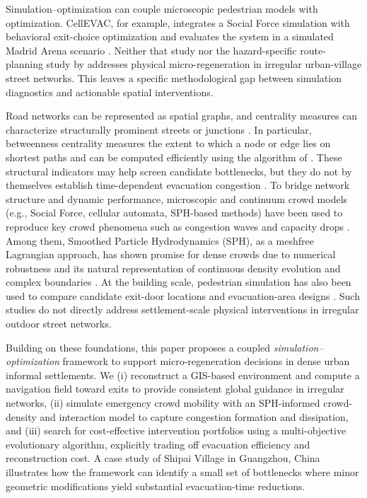 \documentclass[preprint,12pt]{elsarticle}
\begin{document}
Simulation--optimization can couple microscopic pedestrian models with optimization. CellEVAC, for example, integrates a Social Force simulation with behavioral exit-choice optimization and evaluates the system in a simulated Madrid Arena scenario \citep{LopezCarmonaGarcia2021CellEVAC}. Neither that study nor the hazard-specific route-planning study by \cite{yang2025} addresses physical micro-regeneration in irregular urban-village street networks. This leaves a specific methodological gap between simulation diagnostics and actionable spatial interventions.

Road networks can be represented as spatial graphs, and centrality measures can characterize structurally prominent streets or junctions \citep{Crucitti2006CentralityStreets}. In particular, betweenness centrality measures the extent to which a node or edge lies on shortest paths and can be computed efficiently using the algorithm of \cite{Brandes2001Betweenness}. These structural indicators may help screen candidate bottlenecks, but they do not by themselves establish time-dependent evacuation congestion \citep{Helbing2000Panic,Hughes2002ContinuumPedestrians}.
To bridge network structure and dynamic performance, microscopic and continuum crowd models (e.g., Social Force, cellular automata, SPH-based methods) have been used to reproduce key crowd phenomena such as congestion waves and capacity drops \citep{DANG2024102955}.
Among them, Smoothed Particle Hydrodynamics (SPH), as a meshfree Lagrangian approach, has shown promise for dense crowds due to numerical robustness and its natural representation of continuous density evolution and complex boundaries \citep{Yuan2020SPHPedestrianFlow,DANG2024102955}.
At the building scale, pedestrian simulation has also been used to compare candidate exit-door locations and evacuation-area designs \citep{muhammed2020simulation}. Such studies do not directly address settlement-scale physical interventions in irregular outdoor street networks.

Building on these foundations, this paper proposes a coupled \emph{simulation--optimization} framework to support micro-regeneration decisions in dense urban informal settlements.
We (i) reconstruct a GIS-based environment and compute a navigation field toward exits to provide consistent global guidance in irregular networks,
(ii) simulate emergency crowd mobility with an SPH-informed crowd-density and interaction model to capture congestion formation and dissipation,
and (iii) search for cost-effective intervention portfolios using a multi-objective evolutionary algorithm, explicitly trading off evacuation efficiency and reconstruction cost.
A case study of Shipai Village in Guangzhou, China illustrates how the framework can identify a small set of bottlenecks where minor geometric modifications yield substantial evacuation-time reductions.
\end{document}
